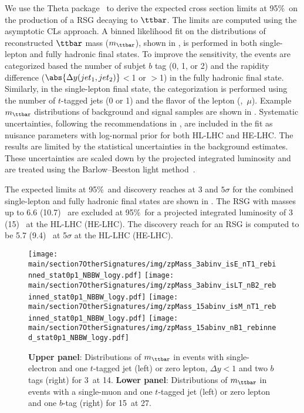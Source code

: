 We use the Theta package~\cite{theta} to derive the expected cross section limits at 95\%~\cl on the production of a RSG decaying to $\ttbar$. 
The limits are computed using the asymptotic CLs approach. 
A binned likelihood fit on the distributions of reconstructed $\ttbar$ mass ($m_{\ttbar}$), shown in , is performed in both single-lepton and fully hadronic final states.
To improve the sensitivity, the events are categorized based the number of subjet $b$ tag (0, 1, or 2) and the rapidity difference ($\abs{\Delta y(jet_1, jet_2)}$$<$1 or $>$1) in the fully hadronic final state.
Similarly, in the single-lepton final state, the categorization is performed using the number of $t$-tagged jets (0 or 1) and the flavor of the lepton (\Pe,~$\mu$).
Example $m_{\ttbar}$ distributions of background and signal samples are shown in .
Systematic uncertainties, following the recommendations in , are included in the fit as nuisance parameters with log-normal prior for both HL-LHC and HE-LHC. The results are limited by the statistical uncertainties in the background estimates. These uncertainties are scaled down by the projected integrated luminosity and are treated using the Barlow--Beeston light method~\cite{BBLITE1,BBLITE2}. 

The expected limits at 95\%~\cl and discovery reaches at 3 and $5\sigma$ for the combined single-lepton and fully hadronic final states are shown in . The RSG with masses up to 6.6 (10.7)~{\TeV} are excluded at 95\%~\cl for a projected integrated luminosity of 3 (15)~{\abinv} at the HL-LHC (HE-LHC). The discovery reach for an RSG is computed to be 5.7 (9.4)~{\TeV} at 5$\sigma$ at the HL-LHC (HE-LHC). 

\begin{figure}[t]
\begin{center}
  \texttt{[image: \\main/section7OtherSignatures/img/zpMass\_3abinv\_isE\_nT1\_rebinned\_stat0p1\_NBBW\_logy.pdf]}
  \texttt{[image: \\main/section7OtherSignatures/img/zpMass\_3abinv\_isLT\_nB2\_rebinned\_stat0p1\_NBBW\_logy.pdf]}
  \texttt{[image: \\main/section7OtherSignatures/img/zpMass\_15abinv\_isM\_nT1\_rebinned\_stat0p1\_NBBW\_logy.pdf]}
  \texttt{[image: \\main/section7OtherSignatures/img/zpMass\_15abinv\_nB1\_rebinned\_stat0p1\_NBBW\_logy.pdf]}
  \caption{{\bf Upper panel}: Distributions of $m_{\ttbar}$ in events with single-electron and one $t$-tagged jet (left) or zero lepton, $\Delta y <1$ and two $b$ tags (right) for 3~\abinv at 14\TeV. {\bf Lower panel}: Distributions of $m_{\ttbar}$ in events with a single-muon and one $t$-tagged jet (left) or zero lepton and one $b$-tag (right) for 15~\abinv at 27\TeV.}
\label{fig:rsg:templates}
\end{center}
\end{figure}

